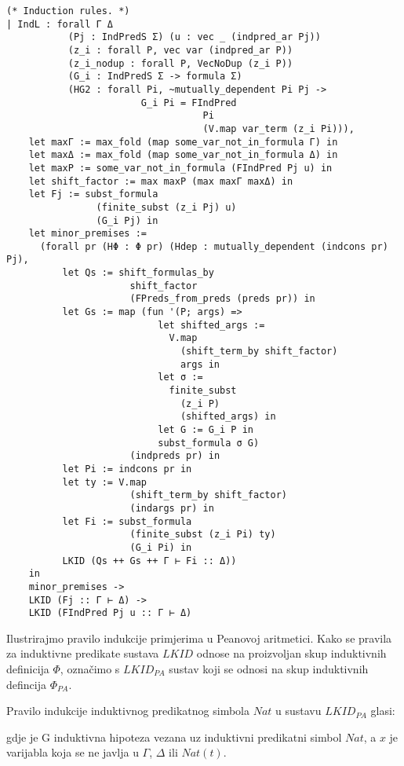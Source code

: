 \begin{verbatim}
(* Induction rules. *)
| IndL : forall Γ Δ
           (Pj : IndPredS Σ) (u : vec _ (indpred_ar Pj))
           (z_i : forall P, vec var (indpred_ar P))
           (z_i_nodup : forall P, VecNoDup (z_i P))
           (G_i : IndPredS Σ -> formula Σ)
           (HG2 : forall Pi, ~mutually_dependent Pi Pj ->
                        G_i Pi = FIndPred
                                   Pi
                                   (V.map var_term (z_i Pi))),
    let maxΓ := max_fold (map some_var_not_in_formula Γ) in
    let maxΔ := max_fold (map some_var_not_in_formula Δ) in
    let maxP := some_var_not_in_formula (FIndPred Pj u) in
    let shift_factor := max maxP (max maxΓ maxΔ) in
    let Fj := subst_formula
                (finite_subst (z_i Pj) u)
                (G_i Pj) in
    let minor_premises :=
      (forall pr (HΦ : Φ pr) (Hdep : mutually_dependent (indcons pr) Pj),
          let Qs := shift_formulas_by
                      shift_factor
                      (FPreds_from_preds (preds pr)) in
          let Gs := map (fun '(P; args) =>
                           let shifted_args :=
                             V.map
                               (shift_term_by shift_factor)
                               args in
                           let σ :=
                             finite_subst
                               (z_i P)
                               (shifted_args) in
                           let G := G_i P in
                           subst_formula σ G)
                      (indpreds pr) in
          let Pi := indcons pr in
          let ty := V.map
                      (shift_term_by shift_factor)
                      (indargs pr) in
          let Fi := subst_formula
                      (finite_subst (z_i Pi) ty)
                      (G_i Pi) in
          LKID (Qs ++ Gs ++ Γ ⊢ Fi :: Δ))
    in
    minor_premises ->
    LKID (Fj :: Γ ⊢ Δ) ->
    LKID (FIndPred Pj u :: Γ ⊢ Δ)
\end{verbatim}

Ilustrirajmo pravilo indukcije primjerima u Peanovoj aritmetici.
Kako se pravila za induktivne predikate sustava \(\mathit{LKID}\) odnose na proizvoljan skup induktivnih definicija \(\Phi\),
označimo s \(\mathit{LKID}_{\mathit{PA}}\)  sustav koji se odnosi na skup induktivnih defincija \(\Phi_{\mathit{PA}}\).
\begin{example}
  Pravilo indukcije induktivnog predikatnog simbola \(\mathit{Nat}\)
  u sustavu \(\mathit{LKID}_{\mathit{PA}}\) glasi:
  \begin{prooftree}
  \end{prooftree}
  \noindent gdje je G induktivna hipoteza vezana uz induktivni predikatni simbol \(\mathit{Nat}\),
  a \(x\) je varijabla koja se ne javlja u \(\Gamma\), \(\Delta\) ili \(\mathit{Nat}(t)\).
\end{example}

